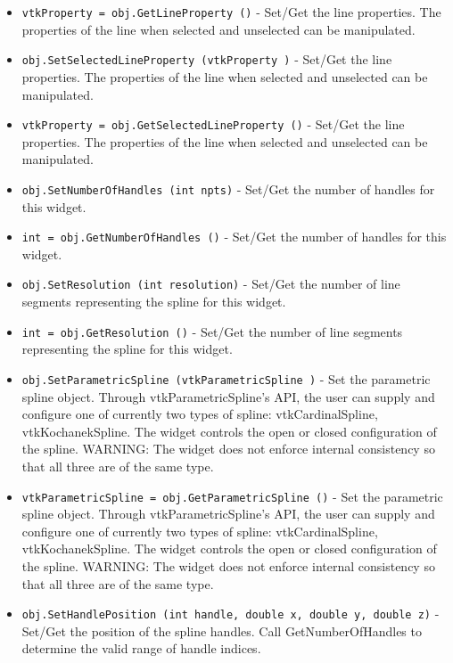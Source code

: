 \begin{itemize}
\item  \verb|vtkProperty = obj.GetLineProperty ()| -  Set/Get the line properties. The properties of the line when selected
 and unselected can be manipulated.

\item  \verb|obj.SetSelectedLineProperty (vtkProperty )| -  Set/Get the line properties. The properties of the line when selected
 and unselected can be manipulated.

\item  \verb|vtkProperty = obj.GetSelectedLineProperty ()| -  Set/Get the line properties. The properties of the line when selected
 and unselected can be manipulated.

\item  \verb|obj.SetNumberOfHandles (int npts)| -  Set/Get the number of handles for this widget.

\item  \verb|int = obj.GetNumberOfHandles ()| -  Set/Get the number of handles for this widget.

\item  \verb|obj.SetResolution (int resolution)| -  Set/Get the number of line segments representing the spline for
 this widget.

\item  \verb|int = obj.GetResolution ()| -  Set/Get the number of line segments representing the spline for
 this widget.

\item  \verb|obj.SetParametricSpline (vtkParametricSpline )| -  Set the parametric spline object. Through vtkParametricSpline's API, the
 user can supply and configure one of currently two types of spline:
 vtkCardinalSpline, vtkKochanekSpline. The widget controls the open
 or closed configuration of the spline.
 WARNING: The widget does not enforce internal consistency so that all
 three are of the same type.

\item  \verb|vtkParametricSpline = obj.GetParametricSpline ()| -  Set the parametric spline object. Through vtkParametricSpline's API, the
 user can supply and configure one of currently two types of spline:
 vtkCardinalSpline, vtkKochanekSpline. The widget controls the open
 or closed configuration of the spline.
 WARNING: The widget does not enforce internal consistency so that all
 three are of the same type.

\item  \verb|obj.SetHandlePosition (int handle, double x, double y, double z)| -  Set/Get the position of the spline handles. Call GetNumberOfHandles
 to determine the valid range of handle indices.


\end{itemize}
